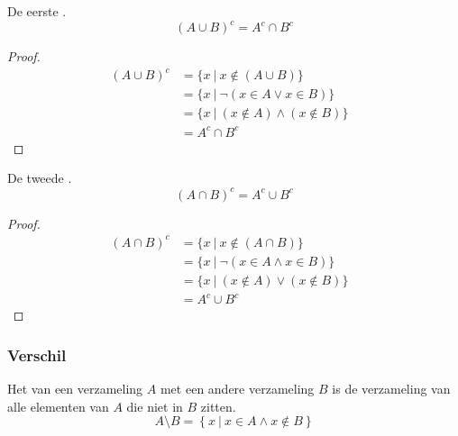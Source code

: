 \documentclass[main.tex]{subfiles}
\begin{document}
\begin{st}
  De eerste .
  \[ (A \cup B)^{c} = A^{c} \cap B^{c} \]

  \begin{proof}
    \[
    \begin{array}{rll}
    (A \cup B)^{c} &= \{ x\ |\ x \not\in (A\cup B) \}&\\
                   &= \{ x\ |\ \neg(x \in A \vee x \in B) \}&\\
                   &= \{ x\ |\ (x \not\in A)\wedge (x \not\in B) \}&\\
                   &= A^{c} \cap B^{c}
    \end{array}
    \]
  \end{proof}
\end{st}

\begin{st}
  De tweede .
  \[ (A \cap B)^{c} = A^{c} \cup B^{c} \]

  \begin{proof}
    \[
    \begin{array}{rll}
      (A \cap B)^{c} &= \{ x\ |\ x \not\in (A\cap B) \}&\\
                     &= \{ x\ |\ \neg(x \in A \wedge x \in B) \}&\\
                     &= \{ x\ |\ (x \not\in A)\vee (x \not\in B) \}&\\
                     &= A^{c} \cup B^{c}
    \end{array}
    \]
  \end{proof}
\end{st}

\subsubsection{Verschil}
\label{sec:verschil}

\begin{de}
  Het  van een verzameling $A$ met een andere verzameling $B$ is de verzameling van alle elementen van $A$ die niet in $B$ zitten.
  \[ A \setminus B = \left\{ x\ |\ x \in A \wedge x \not\in B \right\} \]
\end{de}
\end{document}
